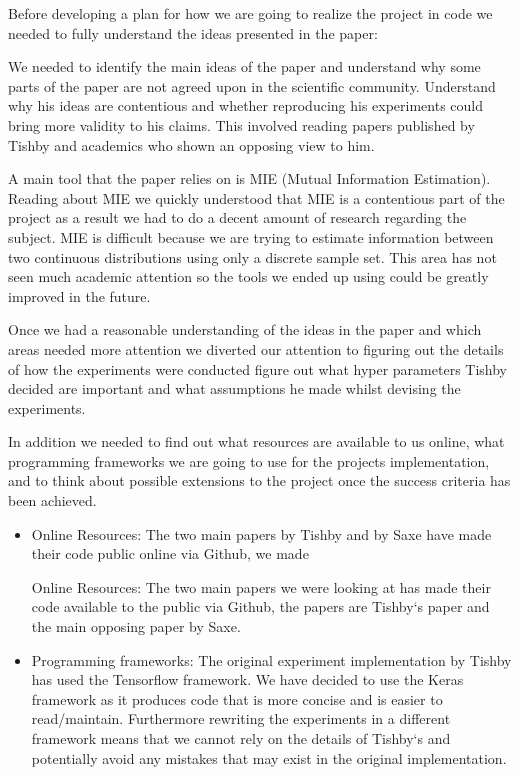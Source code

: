Before developing a plan for how we are going to realize the project in code we
needed to fully understand the ideas presented in the paper:
\begin{itemize}
    \begin{item}
      We needed to identify the main ideas of the paper and understand why some
      parts of the paper are not agreed upon in the scientific community.
      Understand why his ideas are contentious and whether reproducing his
      experiments could bring more validity to his claims. This involved reading
      papers published by Tishby and academics who shown an opposing view to
      him.
    \end{item}
    \begin{item}
      A main tool that the paper relies on is MIE (Mutual Information
      Estimation). Reading about MIE we quickly understood that MIE is a
      contentious part of the project as a result we had to do a decent amount
      of research regarding the subject. MIE is difficult because we are trying
      to estimate information between two continuous distributions using only a
      discrete sample set. This area has not seen much academic attention so the
      tools we ended up using could be greatly improved in the future.
    \end{item}
\end{itemize}

Once we had a reasonable understanding of the ideas in the paper and which areas
needed more attention we diverted our attention to figuring out the details of
how the experiments were conducted figure out what hyper parameters Tishby
decided are important and what assumptions he made whilst devising the
experiments. 

In addition we needed to find out what resources are available to us online,
what programming frameworks we are going to use for the projects implementation,
and to think about possible extensions to the project once the success criteria
has been achieved.

\begin{itemize}
  \item{
      Online Resources: The two main papers by Tishby and by Saxe have made
      their code public online via Github, we made 

      Online Resources: The two main papers we were looking at has made their
      code available to the public via Github, the papers are Tishby`s paper and
      the main opposing paper by Saxe.
    }
  \item{
      Programming frameworks: The original experiment implementation by Tishby
      has used the Tensorflow framework. We have decided to use the Keras
      framework as it produces code that is more concise and is easier to
      read/maintain. Furthermore rewriting the experiments in a different
      framework means that we cannot rely on the details of Tishby`s and
      potentially avoid any mistakes that may exist in the original
      implementation.
    }
\end{itemize}

